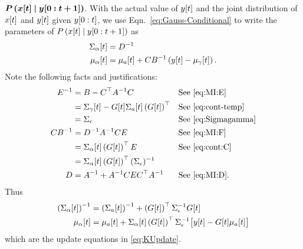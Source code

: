 \begin{enumerate}
{    $\bm{P\left({x}{[t]}\mid y[0:t+1] \right)}$.}  With the
  actual value of ${y}{[t]}$ and the joint distribution of
  ${x}{[t]}$ and ${y}{[t]}$ given $y[0:t]$, we use
  Eqn.~\eqref{eq:Gauss-Conditional} to write the parameters of
  $P\left({x}{[t]}\mid y[0:t+1] \right)$ as
  \begin{subequations}
    \label{eq:UpdateRaw}
    \begin{align}
      {\Sigma_\alpha}{[t]} &= D^{-1} \\
      {\mu_\alpha}{[t]} &= {\mu_a}{[t]} + CB^{-1} \left(
        {y}{[t]} - {\mu_\gamma}{[t]}\right).
    \end{align}
  \end{subequations}
  Note the following facts and justifications:
  \begin{align*}
    E^{-1} &= B - C^\top A^{-1}C && \text{See \eqref{eq:MI:E}}\\
    &= {\Sigma_\gamma}{[t]} - {G}{[t]}{\Sigma_a}{[t]} \left(
    {G}{[t]}\right)^\top && \text{See \eqref{eq:cont-temp}}\\
    &= \Sigma_\epsilon && \text{See \eqref{eq:Sigmagamma}}\\
    CB^{-1} &= D^{-1}A^{-1}CE && \text{See \eqref{eq:MI:F}} \\
    &= {\Sigma_\alpha}{[t]} \left( {G}{[t]}
    \right)^\top E && \text{See \eqref{eq:cont:C}}\\
    &= {\Sigma_\alpha}{[t]} \left( {G}{[t]}
    \right)^\top (\Sigma_\epsilon)^{-1}\\
    D &= A^{-1} + A^{-1} CEC^\top A^{-1} && \text{See \eqref{eq:MI:D}}.
  \end{align*}
  Thus
    \begin{align*}
      \left( {\Sigma_\alpha}{[t]} \right)^{-1} &= \left(
        {\Sigma_a}{[t]} \right)^{-1} + \left( {G}{[t]}
        \right)^\top \Sigma_\epsilon^{-1} {G}{[t]} \\
      {\mu_\alpha}{[t]} &= {\mu_a}{[t]} +
      {\Sigma_{\alpha}}{[t]} \left( {G}{[t]} \right)^\top
      \Sigma_\epsilon^{-1} \big[{y}{[t]} - {G}{[t]}
      {\mu_a}{[t]}\big]
    \end{align*}
  which are the update equations in \eqref{eq:KUpdate}.
\end{enumerate}

